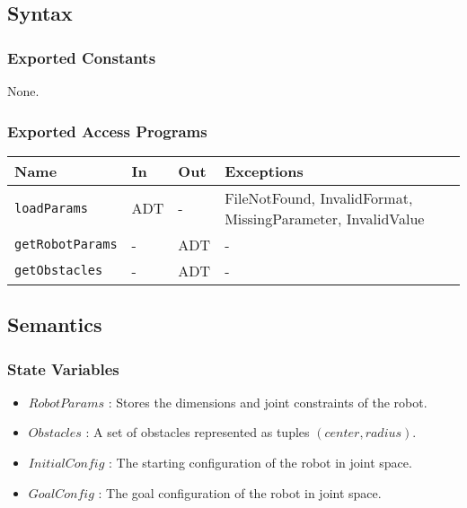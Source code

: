\documentclass[12pt, titlepage]{article}
\begin{document}
\subsection{Syntax}

\subsubsection{Exported Constants}

None.

\subsubsection{Exported Access Programs}

\begin{center}
  \renewcommand{\arraystretch}{1.4}
  \begin{tabular}{p{3cm} p{4cm} p{4cm} p{3cm}}
    \toprule
    \textbf{Name} & \textbf{In} & \textbf{Out} & \textbf{Exceptions} \\
    \midrule
    \texttt{loadParams} & ADT & - & FileNotFound, InvalidFormat, MissingParameter, InvalidValue \\[4pt]
    \texttt{getRobotParams} & - & ADT & - \\[4pt]
    \texttt{getObstacles} & - & ADT & - \\[4pt]
    \bottomrule
  \end{tabular}
\end{center}

\subsection{Semantics}

\subsubsection{State Variables}

\begin{itemize}
    \item \( RobotParams \) : Stores the dimensions and joint constraints of the robot.
    \item \( Obstacles \) : A set of obstacles represented as tuples \( (center, radius) \).
    \item \( InitialConfig \) : The starting configuration of the robot in joint space.
    \item \( GoalConfig \) : The goal configuration of the robot in joint space.
\end{itemize}
\end{document}
